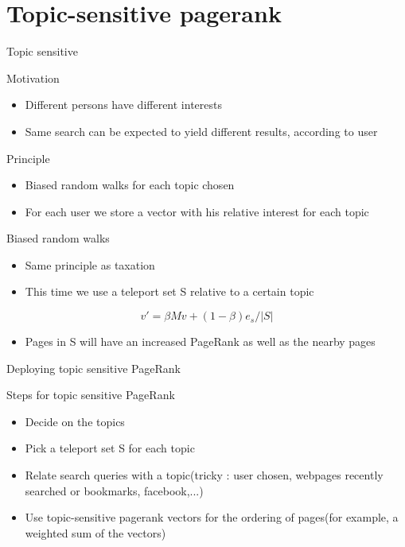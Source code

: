 \documentclass[10pt]{beamer}
\begin{document}
\section{Topic-sensitive pagerank}
\begin{frame}[allowframebreaks]{Topic sensitive}
  \begin{block}{Motivation}
  \begin{itemize}
  \item Different persons have different interests
  \item Same search can be expected to yield different results, according to user
  \end{itemize}
  \end{block}
  \begin{block}{Principle}
  \begin{itemize}
  \item Biased random walks for each topic chosen
  \item For each user we store a vector with his relative interest for each topic
  \end{itemize}
  \end{block}
  \framebreak
  \begin{block}{Biased random walks}
    \begin{itemize}
      \item Same principle as taxation
      \item This time we use a teleport set S relative to a certain topic
    \end{itemize}
    $$ v' = \beta Mv + (1-\beta)e_s/|S|$$
    \begin{itemize}
    \item Pages in S will have an increased PageRank as well as the nearby pages
    \end{itemize}
  \end{block}
\end{frame}


\begin{frame}{Deploying topic sensitive PageRank}
  \begin{block}{Steps for topic sensitive PageRank}
    \begin{itemize}
      \item Decide on the topics
      \item Pick a teleport set S for each topic
      \item Relate search queries with a topic(tricky : user chosen, webpages recently searched or bookmarks, facebook,...)
      \item Use topic-sensitive pagerank vectors for the ordering of pages(for example, a weighted sum of the vectors)
    \end{itemize}
  \end{block}
\end{frame}
\end{document}
